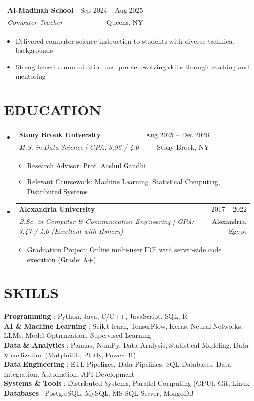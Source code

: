 \documentclass[letterpaper,11pt]{article}
\makeatletter
\newcommand{\resumeItem}[1]{
  \item\small{
    {#1 \vspace{-1pt}}
  }
}
\newcommand{\resumeSubheading}[4]{
  \vspace{-1pt}\item
    \begin{tabular*}{\textwidth}[t]{l@{\extracolsep{\fill}}r}
      \textbf{#1} & {\color{dark-grey}\small #2}\vspace{1pt}\\ %
      \textit{#3} & {\color{dark-grey} \small #4}\\ %
    \end{tabular*}\vspace{-4pt}
}
\newcommand{\resumeSubHeadingListStart}{\begin{itemize}[leftmargin=0in, label={}]}
\newcommand{\resumeSubHeadingListEnd}{\end{itemize}}
\newcommand{\resumeItemListStart}{\begin{itemize}}
\newcommand{\resumeItemListEnd}{\end{itemize}\vspace{0pt}}
\makeatother
\begin{document}
\resumeSubheading
{Al-Madinah School}{Sep 2024 -- Aug 2025}
{Computer Teacher}{Queens, NY}
\resumeItemListStart
\resumeItem{Delivered computer science instruction to students with diverse technical backgrounds}
\resumeItem{Strengthened communication and problem-solving skills through teaching and mentoring}
\resumeItemListEnd

\section{EDUCATION}
\resumeSubHeadingListStart

\resumeSubheading
{Stony Brook University}{Aug 2025 -- Dec 2026}
{M.S. in Data Science | GPA: 3.96 / 4.0}{Stony Brook, NY}
\resumeItemListStart
\resumeItem{Research Advisor: Prof. Anshul Gandhi}
\resumeItem{Relevant Coursework: Machine Learning, Statistical Computing, Distributed Systems}
\resumeItemListEnd

\resumeSubheading
{Alexandria University}{2017 -- 2022}
{B.Sc. in Computer \& Communication Engineering | GPA: 3.47 / 4.0 (Excellent with Honors)}{Alexandria, Egypt}
\resumeItemListStart
\resumeItem{Graduation Project: Online multi-user IDE with server-side code execution (Grade: A+)}
\resumeItemListEnd

\resumeSubHeadingListEnd

\section{SKILLS}
\begin{itemize}[leftmargin=0in, label={}]
\small{\item{

\textbf{Programming} {: Python, Java, C/C++, JavaScript, SQL, R} \vspace{2pt} \\

\textbf{AI \& Machine Learning} {: Scikit-learn, TensorFlow, Keras, Neural Networks, LLMs, Model Optimization, Supervised Learning} \vspace{2pt} \\

\textbf{Data \& Analytics} {: Pandas, NumPy, Data Analysis, Statistical Modeling, Data Visualization (Matplotlib, Plotly, Power BI)} \vspace{2pt} \\

\textbf{Data Engineering} {: ETL Pipelines, Data Pipelines, SQL Databases, Data Integration, Automation, API Development} \vspace{2pt} \\

\textbf{Systems \& Tools} {: Distributed Systems, Parallel Computing (GPU), Git, Linux} \vspace{2pt} \\

\textbf{Databases} {: PostgreSQL, MySQL, MS SQL Server, MongoDB}

}}
\end{itemize}
\end{document}
